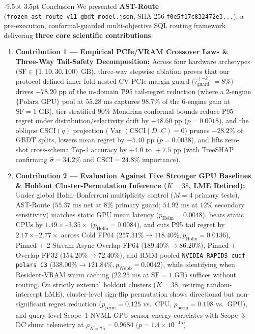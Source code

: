 \documentclass[10pt,a4paper]{article}
\makeatletter
\renewcommand\section{\@startsection{section}{1}{\z@}%
  {-9.5pt \@plus -2pt \@minus -1.5pt}%
  {3.5pt \@plus 1pt}%
  {\normalfont\large\bfseries}}
\makeatother
\begin{document}
\section{Conclusion}
\enlargethispage{1.5\baselineskip}
\vspace{-3pt}
We presented \textbf{AST-Route} (\texttt{frozen\_\allowbreak{}ast\_\allowbreak{}route\_\allowbreak{}v11\_\allowbreak{}gbdt\_\allowbreak{}model.json}, SHA-256 \texttt{f0e5f17c832472e3...}), a pre-execution, conformal-guarded multi-objective SQL routing framework delivering \textbf{three core scientific contributions}:
\begin{enumerate}[leftmargin=1.5em,itemsep=1.5pt]
    \item \textbf{Contribution 1 --- Empirical PCIe/VRAM Crossover Laws \& Three-Way Tail-Safety Decomposition:} Across four hardware archetypes ($\text{SF}\in\{1,10,30,100\}\text{ GB}$), three-way stepwise ablation proves that our protocol-defined inner-fold nested-CV PCIe margin guard ($\hat{\tau}_{\text{guard}}^{(-k)}=8\%$) drives $-78.20\text{ pp}$ of the in-domain P95 tail-regret reduction (where a 2-engine $\{\text{Polars},\text{GPU}\}$ pool at $55.28\text{ ms}$ captures $98.7\%$ of the 6-engine gain at $\text{SF}=1\text{ GB}$), tier-stratified $90\%$ Mondrian conformal bounds reduce P95 regret under distribution/selectivity drift by $-48.60\text{ pp}$ ($p=0.0018$), and the oblique $\text{CSCI}(q)$ projection ($\operatorname{Var}(\text{CSCI}\mid D..C)=0$) prunes $-28.2\%$ of GBDT splits, lowers mean regret by $-5.40\text{ pp}$ ($p=0.0038$), and lifts zero-shot cross-schema Top-1 accuracy by $+4.0\text{ to }+7.5\text{ pp}$ (with TreeSHAP confirming $\hat{\sigma}=34.2\%$ and $\text{CSCI}=24.8\%$ importance).
    \item \textbf{Contribution 2 --- Evaluation Against Five Stronger GPU Baselines \& Holdout Cluster-Permutation Inference ($K=38$, LME Retired):} Under global Holm--Bonferroni multiplicity control ($M=4$ primary tests), AST-Route ($55.37\text{ ms}$ net at $8\%$ primary guard; $54.92\text{ ms}$ at $12\%$ secondary sensitivity) matches static GPU mean latency ($p_{\text{Holm}}=0.0048$), beats static CPUs by $1.49\times\text{--}3.35\times$ ($p_{\text{Holm}}=0.0084$), and cuts P95 tail regret by $2.17\times\text{--}2.77\times$ across Cold FP64 ($257.31\%\rightarrow 118.40\%, p_{\text{Holm}}=0.0136$), Pinned + 2-Stream Async Overlap FP64 ($189.40\%\rightarrow 86.20\%$), Pinned + Overlap FP32 ($154.20\%\rightarrow 72.40\%$), and RMM-pooled \texttt{NVIDIA RAPIDS cudf-polars C3} ($338.00\%\rightarrow 121.84\%, p_{\text{Webb}}=0.0042$), while identifying when Resident-VRAM warm caching ($22.25\text{ ms}$ at $\text{SF}=1\text{ GB}$) suffices without routing. On strictly external holdout clusters ($K=38$, retiring random-intercept LME), cluster-level sign-flip permutation shows directional but non-significant regret reduction ($p_{\text{perm}}=0.125$ vs.\ CPU, $p_{\text{perm}}=0.198$ vs.\ GPU), and query-level Scope~1 NVML GPU sensor energy correlates with Scope~3 DC shunt telemetry at $\rho_{N=75}=0.9684$ ($p=1.4\times 10^{-45}$).

\end{enumerate}
\end{document}
